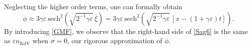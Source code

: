 \documentclass{amsart}
\newcommand{\veps}{\varepsilon}
\numberwithin{equation}{section}
\theoremstyle{plain}%
\theoremstyle{definition}
\theoremstyle{remark}
\theoremstyle{remark}
\begin{document}
Neglecting the higher order terms, one can formally obtain 
\begin{equation}\label{Sag6}
\phi \approx 3\gamma\veps \, \text{sech}^2\left(\sqrt{2^{-1}\gamma\veps}\,\bar{\xi}\right)=3\gamma\veps \, \text{sech}^2\left(\sqrt{2^{-1}\gamma\veps}\,[x-(1+\gamma\veps)t]\right).
\end{equation}
By introducing \eqref{GMF}, we observe that the right-hand side of \eqref{Sag6} is the same as $\veps n_{\text{KdV}}$ when $\sigma=0$, our rigorous approximation of $\phi$. 
\end{document}
